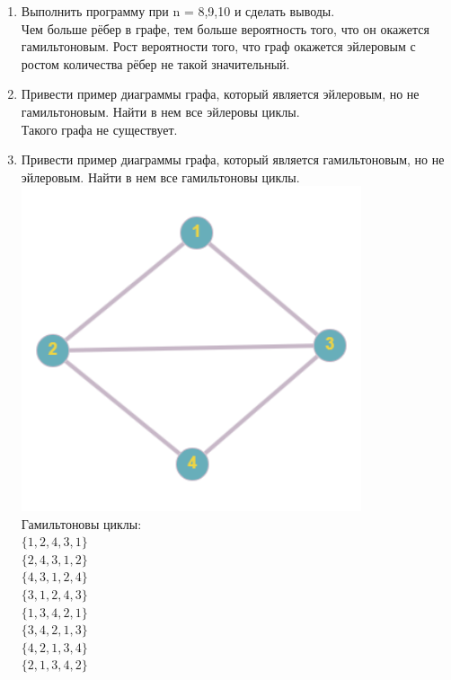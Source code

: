 \documentclass[a4paper,14pt]{extarticle}
\begin{document}
\begin{enumerate}[1.]
    \item Выполнить программу при n = 8,9,10 и сделать выводы.\\
          Чем больше рёбер в графе, тем больше вероятность того, что он окажется
          гамильтоновым.
          Рост вероятности того, что граф окажется эйлеровым с ростом количества рёбер не такой значительный.
    \item Привести пример диаграммы графа, который является эйлеровым,
          но не гамильтоновым. Найти в нем все эйлеровы циклы.\\
          Такого графа не существует. 

    \item Привести пример диаграммы графа, который является
          гамильтоновым, но не эйлеровым. Найти в нем все гамильтоновы циклы.\\
          \includegraphics[width=100mm]{5}\\
          Гамильтоновы циклы:\\
          $\{1, 2, 4, 3, 1\}$\\
          $\{2, 4, 3, 1, 2\}$\\
          $\{4, 3, 1, 2, 4\}$\\
          $\{3, 1, 2, 4, 3\}$\\
          $\{1, 3, 4, 2, 1\}$\\
          $\{3, 4, 2, 1, 3\}$\\
          $\{4, 2, 1, 3, 4\}$\\
          $\{2, 1, 3, 4, 2\}$


\end{enumerate}
\end{document}
